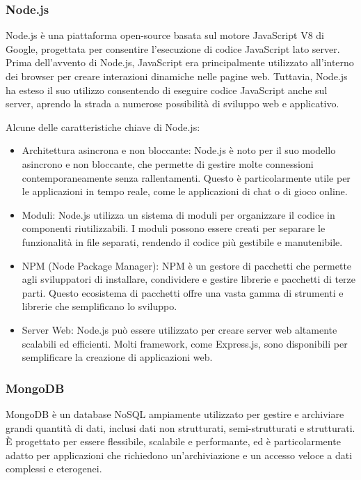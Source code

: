 \documentclass[12pt]{article}
\begin{document}
\subsubsection{Node.js}

Node.js è una piattaforma open-source basata sul motore JavaScript V8 di Google, progettata per consentire l'esecuzione di codice JavaScript lato server. Prima dell'avvento di Node.js, JavaScript era principalmente utilizzato all'interno dei browser per creare interazioni dinamiche nelle pagine web. Tuttavia, Node.js ha esteso il suo utilizzo consentendo di eseguire codice JavaScript anche sul server, aprendo la strada a numerose possibilità di sviluppo web e applicativo.

Alcune delle caratteristiche chiave di Node.js:

\begin{itemize}
    \item Architettura asincrona e non bloccante: Node.js è noto per il suo modello asincrono e non bloccante, che permette di gestire molte connessioni contemporaneamente senza rallentamenti. Questo è particolarmente utile per le applicazioni in tempo reale, come le applicazioni di chat o di gioco online.
    \item Moduli: Node.js utilizza un sistema di moduli per organizzare il codice in componenti riutilizzabili. I moduli possono essere creati per separare le funzionalità in file separati, rendendo il codice più gestibile e manutenibile.
    \item NPM (Node Package Manager): NPM è un gestore di pacchetti che permette agli sviluppatori di installare, condividere e gestire librerie e pacchetti di terze parti. Questo ecosistema di pacchetti offre una vasta gamma di strumenti e librerie che semplificano lo sviluppo.
    \item Server Web: Node.js può essere utilizzato per creare server web altamente scalabili ed efficienti. Molti framework, come Express.js, sono disponibili per semplificare la creazione di applicazioni web.
\end{itemize}

\subsubsection{MongoDB}

MongoDB è un database NoSQL ampiamente utilizzato per gestire e archiviare grandi quantità di dati, inclusi dati non strutturati, semi-strutturati e strutturati. È progettato per essere flessibile, scalabile e performante, ed è particolarmente adatto per applicazioni che richiedono un'archiviazione e un accesso veloce a dati complessi e eterogenei.
\end{document}
